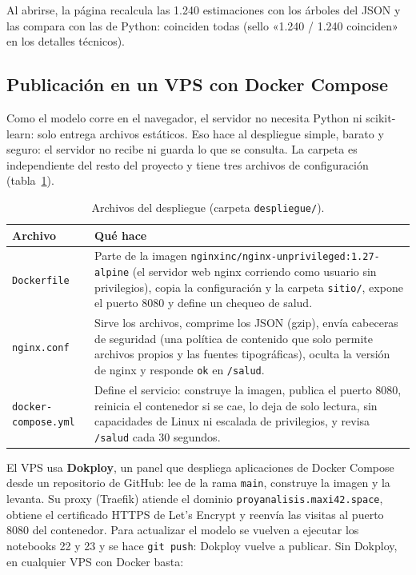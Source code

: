 \documentclass[11pt,a4paper]{article}
\begin{document}
\noindent Al abrirse, la página recalcula las 1.240 estimaciones con los árboles del JSON y las compara con las de
Python: coinciden todas (sello «1.240 / 1.240 coinciden» en los detalles técnicos).

\subsection{Publicación en un VPS con Docker Compose}

Como el modelo corre en el navegador, el servidor no necesita Python ni scikit-learn: solo entrega archivos estáticos. Eso
hace al despliegue simple, barato y seguro: el servidor no recibe ni guarda lo que se consulta. La carpeta
 es independiente del resto del proyecto y tiene tres archivos de configuración
(tabla~\ref{tab:despliegue}).

\begin{table}[H]
  \centering\small
  \caption{Archivos del despliegue (carpeta \texttt{despliegue/}).}
  \label{tab:despliegue}
  \begin{tabular}{lp{11cm}}
    \toprule
    Archivo & Qué hace \\
    \midrule
    \texttt{Dockerfile} & Parte de la imagen \texttt{nginxinc/nginx-unprivileged:1.27-alpine} (el servidor web nginx
      corriendo como usuario sin privilegios), copia la configuración y la carpeta \texttt{sitio/}, expone el puerto 8080
      y define un chequeo de salud. \\
    \texttt{nginx.conf} & Sirve los archivos, comprime los JSON (gzip), envía cabeceras de seguridad (una política de
      contenido que solo permite archivos propios y las fuentes tipográficas), oculta la versión de nginx y responde
      \texttt{ok} en \texttt{/salud}. \\
    \texttt{docker-compose.yml} & Define el servicio: construye la imagen, publica el puerto 8080, reinicia el contenedor
      si se cae, lo deja de solo lectura, sin capacidades de Linux ni escalada de privilegios, y revisa \texttt{/salud}
      cada 30 segundos. \\
    \bottomrule
  \end{tabular}
\end{table}

\noindent El VPS usa \textbf{Dokploy}, un panel que despliega aplicaciones de Docker Compose desde un repositorio de
GitHub: lee  de la rama \texttt{main}, construye la imagen y la levanta. Su proxy
(Traefik) atiende el dominio \texttt{proyanalisis.maxi42.space}, obtiene el certificado HTTPS de Let's Encrypt y reenvía
las visitas al puerto 8080 del contenedor. Para actualizar el modelo se vuelven a ejecutar los notebooks 22 y 23 y se hace
\texttt{git push}: Dokploy vuelve a publicar. Sin Dokploy, en cualquier VPS con Docker basta:
\end{document}
